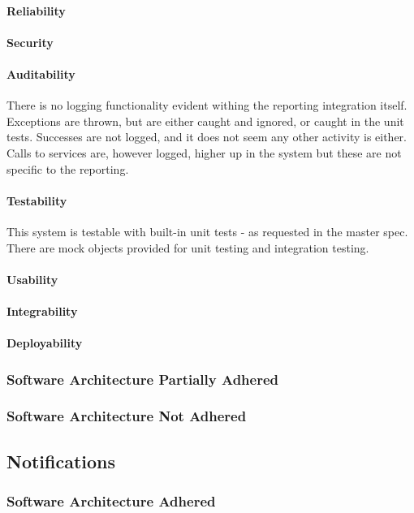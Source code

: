\documentclass{article}
\begin{document}
            \paragraph{Reliability}
            \paragraph{Security}
            \paragraph{Auditability}
            There is no logging functionality evident withing the reporting integration itself. Exceptions are thrown, but are either caught and ignored, or caught in the unit tests. Successes are not logged, and it does not seem any other activity is either. Calls to services are, however logged, higher up in the system but these are not specific to the reporting.
            \paragraph{Testability}
            This system is testable with built-in unit tests - as requested in the master spec. There are mock objects provided for unit testing and integration testing.
            \paragraph{Usability}
            \paragraph{Integrability}
            \paragraph{Deployability}
        \subsubsection{Software Architecture Partially Adhered}
        \subsubsection{Software Architecture Not Adhered}       
        
    \subsection{Notifications}
        \subsubsection{Software Architecture Adhered}
\end{document}
